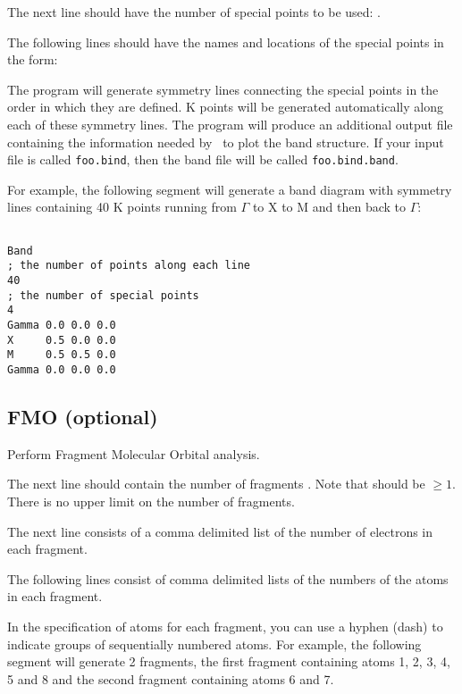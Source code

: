 The next line should have the number of special points to be used:
. 

The following  lines should have the names
and locations of the special points in the form:

   

The program will generate symmetry lines connecting the special points
in the order in which they are defined.   K
points will be generated automatically along each of these symmetry
lines.  The program will produce an additional output file containing
the information needed by \viewprog\ to plot the band structure.  If
your input file is called {\tt foo.bind}, then the band file will be
called {\tt foo.bind.band}.

For example, the following segment will generate a band diagram with
symmetry lines containing 40 K points running from $\Gamma$ to X to M and
then back to $\Gamma$:

\shrinkspacing
\begin{verbatim}

Band
; the number of points along each line
40
; the number of special points
4
Gamma 0.0 0.0 0.0
X     0.5 0.0 0.0
M     0.5 0.5 0.0
Gamma 0.0 0.0 0.0

\end{verbatim}
\resumespacing

\subsection{{\sf FMO} (optional)}

Perform Fragment Molecular Orbital analysis.

The next line should contain the number of fragments
.  Note that  should be
$\geq 1$.  There is no upper limit on the number of fragments.

The next line consists of a comma delimited list of the number of
electrons in each fragment.

The following  lines consist of comma delimited
lists of the numbers of the atoms in each fragment.

In the specification of atoms for each fragment, you can use a hyphen
(dash) to indicate groups of sequentially numbered atoms.
For example, the following segment will generate 2 fragments, the
first fragment containing atoms 1, 2, 3, 4, 5 and 8 and the second fragment
containing atoms 6 and 7. \\


